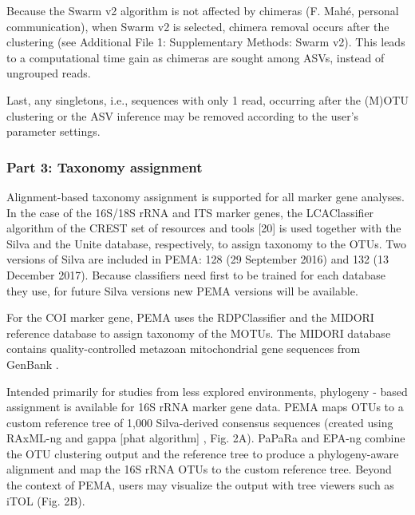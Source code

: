    Because the Swarm v2 algorithm is not affected by chimeras (F. Mahé, personal communication), when Swarm v2 is selected, chimera removal occurs after the clustering (see Additional File 1: Supplementary Methods: Swarm v2). 
   This leads to a computational time gain as chimeras are sought among ASVs, instead of ungrouped reads.

   Last, any singletons, i.e., sequences with only 1 read, occurring after the (M)OTU clustering or the ASV inference may be removed according to the user's parameter settings.


   \subsubsection*{Part 3: Taxonomy assignment}

   Alignment-based taxonomy assignment is supported for all marker gene analyses. 
   In the case of the 16S/18S rRNA and ITS marker genes, the LCAClassifier algorithm of the CREST set of resources and tools [20] is used together with the Silva \citep{quast2012silva} and the Unite \citep{nilsson2019unite} database, respectively, to assign taxonomy to the OTUs. 
   Two versions of Silva are included in PEMA: 128 (29 September 2016) and 132 (13 December 2017). 
   Because classifiers need first to be trained for each database they use, for future Silva \citep{quast2012silva} versions new PEMA versions will be available.

   For the COI marker gene, PEMA uses the RDPClassifier \citep{wang2007naive} and the MIDORI reference database \citep{machida2017metazoan} to assign taxonomy of the MOTUs. 
   The MIDORI database contains quality-controlled metazoan mitochondrial gene sequences from GenBank \citep{benson2018genbank}.

   Intended primarily for studies from less explored environments, phylogeny - based assignment is available for 16S rRNA marker gene data. 
   PEMA maps OTUs to a custom reference tree of 1,000 Silva-derived consensus sequences (created using RAxML-ng \citep{kozlov2019raxml} and gappa [phat algorithm] \citep{czech2019methods}, Fig. 2A). 
   PaPaRa \citep{berger2012papara} and EPA-ng \citep{barbera2019epa} combine the OTU clustering output and the reference tree to produce a phylogeny-aware alignment and map the 16S rRNA OTUs to the custom reference tree. 
   Beyond the context of PEMA, users may visualize the output with tree viewers such as iTOL \citep{letunic2021interactive} (Fig. 2B).

